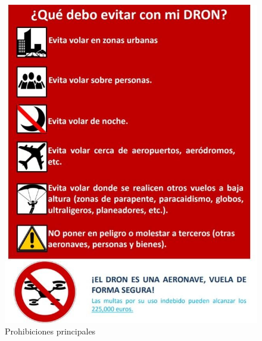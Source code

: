 \begin{figure}[H]
  \centering
  \includegraphics[scale=0.3]{imagenes/prohibiciones.jpg}
  \caption{Prohibiciones principales}
  \label{fig:prohibiciones}
\end{figure}


